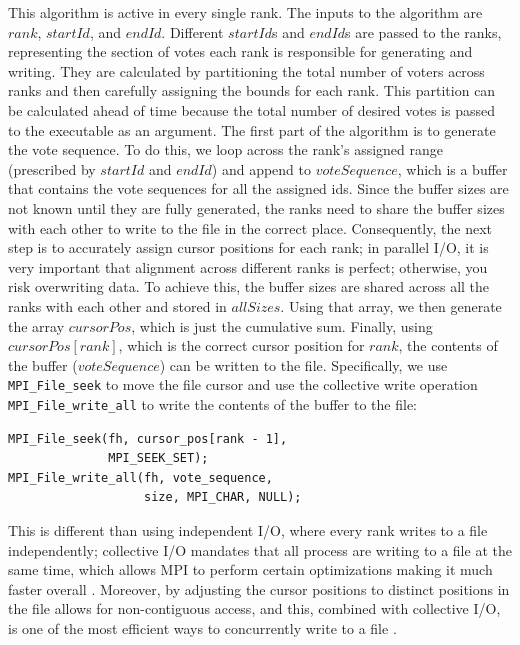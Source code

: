 \documentclass[final,5p,times,twocolumn,authoryear, 10pt]{elsarticle}
\newcommand{\C}[1]{\lstinline{#1}}
\begin{document}
This algorithm is active in every single rank. The inputs to the algorithm are
$rank$, $startId$, and $endId$. Different $startId$s and $endId$s are passed to
the ranks, representing the section of votes each rank is responsible for
generating and writing. They are calculated by partitioning the total number of
voters across ranks and then carefully assigning the bounds for each rank. This
partition can be calculated ahead of time because the total number of desired
votes is passed to the executable as an argument. The first part of the
algorithm is to generate the vote sequence. To do this, we loop across the
rank's assigned range (prescribed by $startId$ and $endId$) and append to
$voteSequence$, which is a buffer that contains the vote sequences for all the
assigned ids. Since the buffer sizes are not known until they are fully
generated, the ranks need to share the buffer sizes with each other to write to
the file in the correct place. Consequently, the next step is to accurately
assign cursor positions for each rank; in parallel I/O, it is very important
that alignment across different ranks is perfect; otherwise, you risk
overwriting data. To achieve this, the buffer sizes are shared across all the
ranks with each other and stored in $allSizes$. Using that array, we then
generate the array $cursorPos$, which is just the cumulative sum. Finally,
using $cursorPos[rank]$, which is the correct cursor position for $rank$, the
contents of the buffer ($voteSequence$) can be written to the file.
Specifically, we use \C{MPI_File_seek} to move the file cursor and use the
collective write operation \C{MPI_File_write_all} to write the contents of the
buffer to the file:
\begin{center}
    \begin{BVerbatim}
MPI_File_seek(fh, cursor_pos[rank - 1], 
              MPI_SEEK_SET);
MPI_File_write_all(fh, vote_sequence, 
                   size, MPI_CHAR, NULL);
    \end{BVerbatim}
\end{center}
This is different than using independent I/O, where every rank writes to a file
independently; collective I/O mandates that all process are writing to a file
at the same time, which allows MPI to perform certain optimizations making it
much faster overall \cite{pacheco}. Moreover, by adjusting the cursor positions
to distinct positions in the file allows for non-contiguous access, and this,
combined with collective I/O, is one of the most efficient ways to concurrently
write to a file \cite{ching}.
\end{document}
